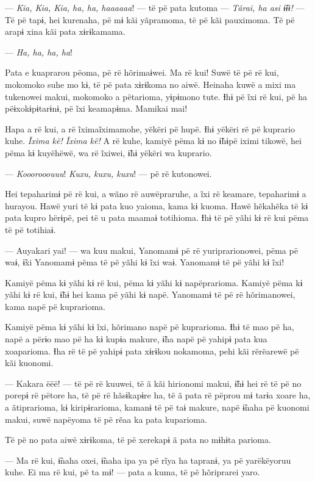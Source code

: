--- \textit{Kia, Kia, Kia, ha, ha, haaaaaa}! --- të pë pata kutoma --- \textit{Tãrai, ha asi
 ɨ̃ɨɨ!} --- Të pë tapɨ, hei kurenaha, pë mɨ kãi yãpramoma, të pë kãi
 pauximoma. Të pë arapɨ xina kãi pata xɨrɨkamama. 

--- \textit{Ha, ha, ha, ha}! 

Pata e kuaprarou pëoma, pë rë hõrimaɨwei. Ma rë kui! Suwë të pë rë kui,
mokomoko suhe mo kɨ, të pë pata xɨrɨkoma no aiwë. Heinaha kuwë a mixi ma
tukenowei makui, mokomoko a pëtarioma, yɨpɨmono tute. Ɨhɨ pë ĩxi rë kui,
pë ha pëɨxokɨpɨtarɨnɨ, pë ĩxi keamapɨma. Mamikai mai! 

Hapa a rë kui, a rë ĩximaĩximamohe, yëkëri pë hupë. Ɨhɨ yëkëri rë pë
kuprario kuhe. \textit{Ĩxima kë! Ĩxima kë!} A rë kuhe, kamiyë pëma kɨ no ɨ̃hɨpë
iximi tikowë, hei pëma kɨ kuyëhëwë, wa rë ĩxiwei, ɨ̃hɨ yëkëri wa
kuprario. 

--- \textit{Kooorooouuu}! \textit{Kuxu, kuxu, kuxu}! --- pë rë kutonowei. 

Hei tepaharimɨ pë rë kui, a wãno rë auwëpraruhe, a ĩxi rë keamare,
tepaharimɨ a hurayou. Hawë yuri të kɨ pata kuo yaioma, kama kɨ kuoma.
Hawë hẽkahẽka të kɨ pata kupro hërɨpë, pei të u pata maamaɨ totihioma.
Ɨhɨ të pë yãhi kɨ rë kui pëma të pë totihiaɨ. 

--- Auyakari yai! --- wa kuu makui, Yanomamɨ pë rë yuriprarionowei, pëma pë
waɨ, ɨ̃xi Yanomamɨ pëma të pë yãhi kɨ ĩxi waɨ. Yanomamɨ të pë yãhi kɨ
ĩxi! 

Kamiyë pëma kɨ yãhi kɨ rë kui, pëma kɨ yãhi kɨ napëprarioma. Kamiyë pëma
 kɨ yãhi kɨ rë kui, ɨ̃hɨ hei kama pë yãhi kɨ napë. Yanomamɨ të pë rë
 hõrimanowei, kama napë pë kuprarioma. 

Kamiyë pëma kɨ yãhi kɨ ĩxi, hõrimano napë pë kuprarioma. Ɨhɨ të mao pë
ha, napë a përɨo mao pë ha kɨ kupɨa makure, ɨ̃ha napë pë yahipɨ pata kua
xoaparioma. Ɨha rë të pë yahipɨ pata xɨrɨkou nokamoma, pehi kãi
rërëarewë pë kãi kuonomi. 

--- Kakara ëëë! --- të pë rë kuuwei, të ã kãi hirionomi makui, ɨ̃hɨ hei rë
të pë no porepɨ rë pëtore ha, të pë rë hãsɨkapɨre ha, të ã pata rë
pëprou mɨ tarɨa xoare ha, a ãtiprarioma, kɨ kiripɨrarioma, kamanɨ të pë
taɨ makure, napë ɨ̃naha pë kuonomi makui, suwë napëyoma të pë rẽaa ka
pata kuparioma. 

Të pë no pata aiwë xɨrɨkoma, të pë xerekapɨ ã pata no mɨhɨta parioma. 

--- Ma rë kui, ɨ̃naha oxei, ɨ̃naha ipa ya pë rĩya ha tapranɨ, ya pë
yarëkëyoruu kuhe. Ei ma rë kui, pë ta mɨ! --- pata a kuma, të pë
hõriprarei yaro. 

